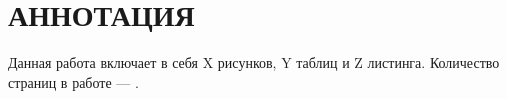 \section*{АННОТАЦИЯ}
\thispagestyle{empty}

Данная работа включает в себя X рисунков, Y таблиц и Z листинга.
Количество страниц в работе — \ztotpages.
